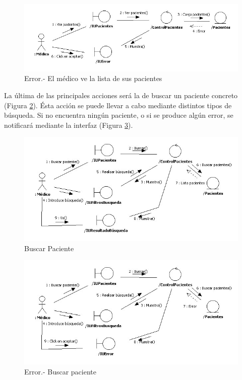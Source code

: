 		\begin{figure}[H]
		  \centering
		    \includegraphics[width=16cm]{img/jpg/colaboraciones/14_VerTodosPacientesError.jpg}
		  \caption{Error.- El médico ve la lista de sus pacientes}
		  \label{fig:col_ver_pacientes_medico_err}
		\end{figure}
		
		La última de las principales acciones será la de buscar un paciente concreto (Figura \ref{fig:col_buscarpaciente_medico}). Ésta acción se puede llevar a cabo mediante distintos tipos de búsqueda. Si no encuentra ningún paciente, o si se produce algún error, se notificará mediante la interfaz (Figura \ref{fig:col_buscarpaciente_medico_err}).
		
		\begin{figure}[H]
		  \centering
		    \includegraphics[width=16cm]{img/jpg/colaboraciones/15_BuscarPaciente.jpg}
		  \caption{Buscar Paciente}
		  \label{fig:col_buscarpaciente_medico}
		\end{figure}
		
		\begin{figure}[H]
		  \centering
		    \includegraphics[width=16cm]{img/jpg/colaboraciones/16_BuscarPacienteError.jpg}
		  \caption{Error.- Buscar paciente}
		  \label{fig:col_buscarpaciente_medico_err}
		\end{figure}
		
